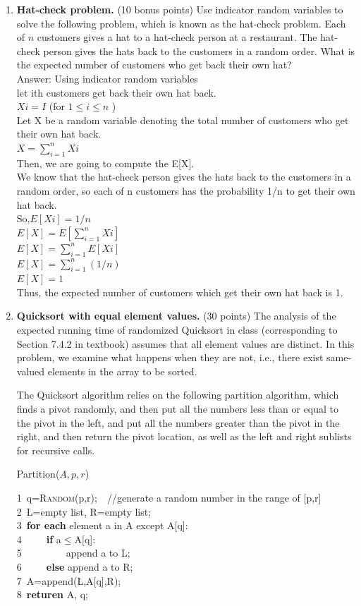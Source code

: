 \documentclass[12pt]{article}
\begin{document}
\begin{enumerate}
	\item \textbf{Hat-check problem.} (10 bonus points) Use indicator random variables to solve the following problem, which is known as the hat-check problem. Each of $n$ customers gives a hat to a hat-check person at a restaurant. The hat-check person gives the hats back to the customers in a random order. What is the expected number of customers who get back their own hat?
   \\ {\color{blue}Answer:	Using indicator random variables
   \\let ith customers get back their own hat back.
   \\$Xi = I$ (for $1 \le i \le n$ )
   \\Let X be a random variable denoting the total number of customers who get their own hat back.
   \\$X = \sum_{i=1}^{n}Xi$
   \\Then, we are going to compute the E[X].
   \\We know that the hat-check person gives the hats back to the customers in a random order, so each of n customers has the probability 1/n to get their own hat back.
   \\So,$ E[Xi] = 1/n$
   \\$ E[X] = E[\sum_{i=1}^{n}Xi]$
   \\$ E[X] = \sum_{i=1}^{n}E[Xi]$
   \\$ E[X] = \sum_{i=1}^{n}(1/n)$
   \\$ E[X] = 1$
   \\Thus, the expected number of customers which get their own hat back is 1.
    }
	\item \textbf{Quicksort with equal element values.} (30 points) The analysis of the expected running time of randomized Quicksort in class (corresponding to Section 7.4.2 in textbook) assumes that all element values are distinct. In this problem, we examine what happens when they are not, i.e., there exist same-valued elements in the array to be sorted.
	
	The Quicksort algorithm relies on the following partition algorithm, which finds a pivot randomly, and then put all the numbers less than or equal to the pivot in the left, and put all the numbers greater than the pivot in the right, and then return the pivot location, as well as the left and right sublists for recursive calls.
		\begin{algorithm}
		\caption{Partition($A, p, r$)}
		1~q=\textsc{Random}(p,r);~~//generate a random number in the range of [p,r]\\
		2~L=empty list, R=empty list;\\
		3~\textbf{for each} element a in A except A[q]:\\
		4~~~~~\textbf{if} a$\le$A[q]:\\
		5~~~~~~~~~append a to L;\\
		6~~~~~\textbf{else} append a to R;\\
		7~A=append(L,A[q],R);\\
		8~\textbf{returen} A, q;
	\end{algorithm}
	

\end{enumerate}
\end{document}
